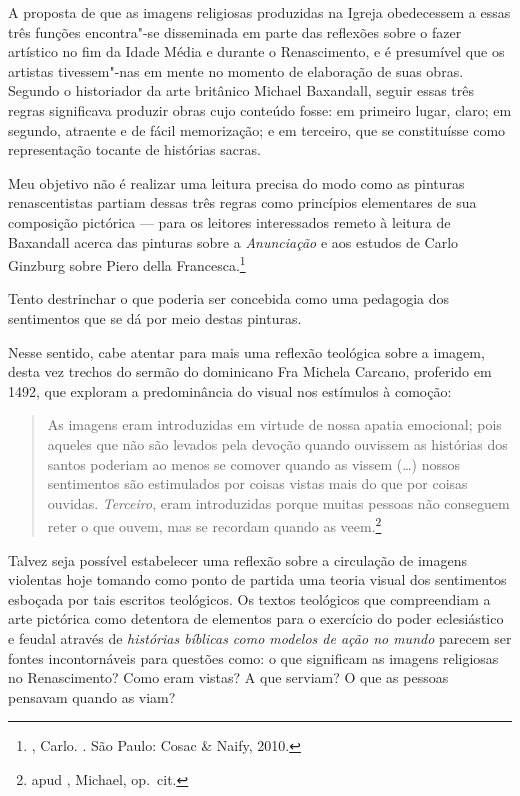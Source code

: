A proposta de que as imagens religiosas produzidas na Igreja obedecessem
a essas três funções encontra"-se disseminada em parte das reflexões
sobre o fazer artístico no fim da Idade Média e durante o Renascimento,
e é presumível que os artistas tivessem"-nas em mente no momento de
elaboração de suas obras. Segundo o historiador da arte britânico
Michael Baxandall, seguir essas três regras significava produzir obras
cujo conteúdo fosse: em primeiro lugar, claro; em segundo, atraente e de
fácil memorização; e em terceiro, que se constituísse como representação
tocante de histórias sacras.

Meu objetivo não é realizar uma leitura precisa do modo como as pinturas
renascentistas partiam dessas três regras como princípios elementares de
sua composição pictórica --- para os leitores interessados remeto à
leitura de Baxandall acerca das pinturas sobre a \emph{Anunciação} e aos
estudos de Carlo Ginzburg sobre Piero della Francesca.\footnote{,
  Carlo. {}. São Paulo: Cosac \& Naify, 2010.}

Tento
destrinchar o que poderia ser concebida como uma pedagogia dos
sentimentos que se dá por meio destas pinturas.


Nesse sentido, cabe atentar para mais uma reflexão teológica sobre a
imagem, desta vez trechos do sermão do dominicano Fra Michela Carcano,
proferido em 1492, que exploram a predominância do visual nos estímulos
à comoção:

\begin{quote}
As imagens eram introduzidas em virtude de nossa apatia
emocional; pois aqueles que não são levados pela devoção quando ouvissem
as histórias dos santos poderiam ao menos se comover quando as vissem
(\ldots{}) nossos sentimentos são estimulados por coisas vistas mais do que
por coisas ouvidas. \emph{Terceiro}, eram introduzidas porque muitas
pessoas não conseguem reter o que ouvem, mas se recordam quando as
veem.\footnote{ apud , Michael, op.~cit.}
\end{quote}

Talvez seja possível estabelecer uma reflexão sobre a circulação de
imagens violentas hoje tomando como ponto de partida uma teoria visual
dos sentimentos esboçada por tais escritos teológicos. Os textos
teológicos que compreendiam a arte pictórica como detentora de elementos
para o exercício do poder eclesiástico e feudal através de
\emph{histórias bíblicas como modelos de ação no mundo} parecem ser
fontes incontornáveis para questões como: o que significam as imagens
religiosas no Renascimento? Como eram vistas? A que serviam? O que as
pessoas pensavam quando as viam?

